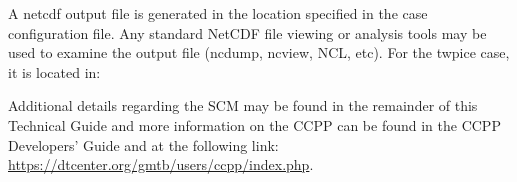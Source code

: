 
A netcdf output file is generated in the location specified in the case
configuration file. Any standard NetCDF file viewing or analysis tools may be used to 
examine the output file (ncdump, ncview, NCL, etc).  For the twpice case, it is located in:


Additional details regarding the SCM may be found in the remainder of this Technical Guide and more information on the CCPP can be found in the CCPP Developers' Guide and at the following link: 
\url{https://dtcenter.org/gmtb/users/ccpp/index.php}.







